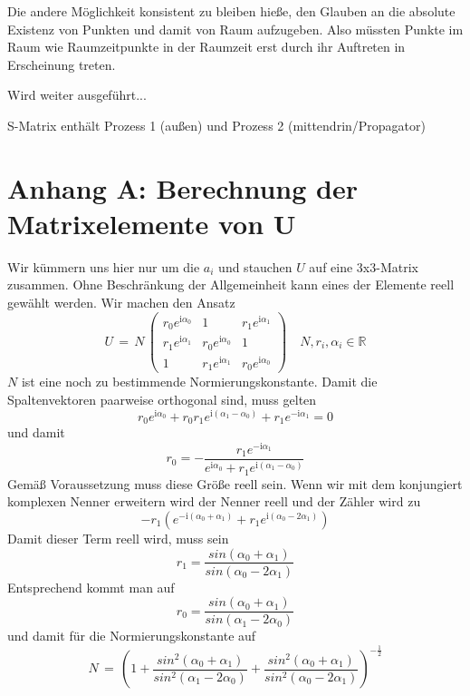 \documentclass[12pt]{article}
\begin{document}
Die andere Möglichkeit konsistent zu bleiben hieße, den Glauben an die absolute Existenz von Punkten und damit von Raum aufzugeben. Also müssten Punkte im Raum wie Raumzeitpunkte in der Raumzeit erst durch ihr Auftreten in Erscheinung treten. 

Wird weiter ausgeführt...

S-Matrix enthält Prozess 1 (außen) und Prozess 2 (mittendrin/Propagator)

\section{Anhang A: Berechnung der Matrixelemente von U}

Wir kümmern uns hier nur um die $a_i$ und stauchen $U$ auf eine 3x3-Matrix zusammen. Ohne Beschränkung der Allgemeinheit kann eines der Elemente reell gewählt werden. Wir machen den Ansatz
\begin{equation*}
U\, =\, N \, 
\begin{pmatrix}
r_0 e^{\mathrm i\alpha_0} & 1 & r_1 e^{\mathrm i\alpha_1} \\
r_1 e^{\mathrm i\alpha_1} & r_0 e^{\mathrm i\alpha_0} & 1 \\
1 & r_1 e^{\mathrm i\alpha_1} & r_0 e^{\mathrm i\alpha_0}
\end{pmatrix}
\quad N, r_i, \alpha_i \in \mathbb{R}
\end{equation*}
$N$ ist eine noch zu bestimmende Normierungskonstante. Damit die Spaltenvektoren paarweise orthogonal sind, muss gelten
\begin{equation*}
r_0 e^{\mathrm  i\alpha_0} + r_0 r_1 e^{\mathrm i(\alpha_1 - \alpha_0)} + r_1 e^{- \mathrm  i\alpha_1} = 0
\end{equation*}
und damit 
\begin{equation*}
r_0 = - \frac{r_1 e^{-\mathrm i\alpha_1}}{ e^{\mathrm i\alpha_0} + r_1 e^{\mathrm i(\alpha_1 - \alpha_0)} }
\end{equation*}
Gemäß Voraussetzung muss diese Größe reell sein. Wenn wir mit dem konjungiert komplexen Nenner erweitern wird der Nenner reell und der Zähler wird zu
\begin{equation*}
-r_1 \left( e^{-\mathrm i(\alpha_0+\alpha_1)} + r_1 e^{\mathrm i(\alpha_0-2\alpha_1)} \right)
\end{equation*}
Damit dieser Term reell wird, muss sein
\begin{equation*}
r_1=\frac{sin(\alpha_0+\alpha_1)}{sin(\alpha_0-2\alpha_1)}
\end{equation*}
Entsprechend kommt man auf 
\begin{equation*}
r_0=\frac{sin(\alpha_0+\alpha_1)}{sin(\alpha_1-2\alpha_0)}
\end{equation*}
und damit für die Normierungskonstante auf 
\begin{equation*}
N\, = \, \left( 1 +
\frac{sin^2(\alpha_0+\alpha_1)}{sin^2(\alpha_1-2\alpha_0)} +
\frac{sin^2(\alpha_0+\alpha_1)}{sin^2(\alpha_0-2\alpha_1)} \right)^{-\frac{1}{2}}
\end{equation*}
\end{document}
